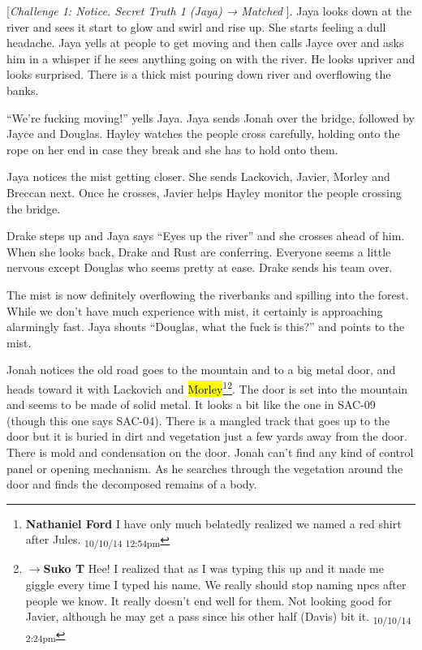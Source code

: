 {[}\textit{Challenge 1: Notice.  Secret Truth 1 (Jaya) → Matched }{]}.  Jaya looks down at the river and sees it start to glow and swirl and rise up.  She starts feeling a dull headache.  Jaya yells at people to get moving and then calls Jayce over and asks him in a whisper if he sees anything going on with the river.  He looks upriver and looks surprised.  There is a thick mist pouring down river and overflowing the banks. 

``We're fucking moving!'' yells Jaya.  Jaya sends Jonah over the bridge, followed by Jayce and Douglas.   Hayley watches the people cross carefully, holding onto the rope on her end in case they break and she has to hold onto them.

Jaya notices the mist getting closer.  She sends Lackovich, Javier, Morley and Breccan next.  Once he crosses, Javier helps Hayley monitor the people crossing the bridge.  

Drake steps up and Jaya says ``Eyes up the river'' and she crosses ahead of him.  When she looks back, Drake and Rust are conferring.  Everyone seems a little nervous except Douglas who seems pretty at ease.  Drake sends his team over.  

The mist is now definitely overflowing the riverbanks and spilling into the forest.  While we don't have much experience with mist, it certainly is approaching alarmingly fast.  Jaya shouts ``Douglas, what the fuck is this?'' and points to the mist.



Jonah notices the old road goes to the mountain and to a big metal door, and heads toward it with Lackovich and \hl{Morley}\footnote{\textbf{Nathaniel Ford }I have only much belatedly realized we named a red shirt after Jules. \textsubscript{10/10/14 12:54pm}}\footnote{$\rightarrow$\textbf{Suko T }Hee!  I realized that as I was typing this up and it made me giggle every time I typed his name.  We really should stop naming npcs after people we know.  It really doesn't end well for them.  Not looking good for Javier, although he may get a pass since his other half (Davis) bit it. \textsubscript{10/10/14 2:24pm}}.  The door is set into the mountain and seems to be made of solid metal.  It looks a bit like the one in SAC-09 (though this one says SAC-04).  There is a mangled track that goes up to the door but it is buried in dirt and vegetation just a few yards away from the door.  There is mold and condensation on the door.  Jonah can't find any kind of control panel or opening mechanism.  As he searches through the vegetation around the door and finds the decomposed remains of a body.

